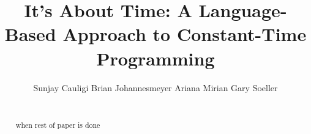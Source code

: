 \documentclass{sig-alternate-10pt}
\newcommand{\tk}{{\color{red}{\bf TK}}\xspace}
\newcommand{\TK}{\tk}
\begin{document}
\title{It's About Time: A Language-Based Approach to Constant-Time Programming}

\author{
\alignauthor%
Sunjay Cauligi\qquad
Brian Johannesmeyer\qquad
Ariana Mirian\qquad
Gary Soeller\qquad
\smallskip\\\\%
}

\maketitle
\thispagestyle{empty}

\newcommand{\update}[1]{{\color{blue}#1}\xspace}

\newcommand{\twolinecell}[2][r]{%
  \begin{tabular}[#1]{@{}c@{}}#2\end{tabular}}


\pagestyle{plain}
\thispagestyle{empty}

\begin{abstract}
\TK when rest of paper is done

\end{abstract}












\end{document}

